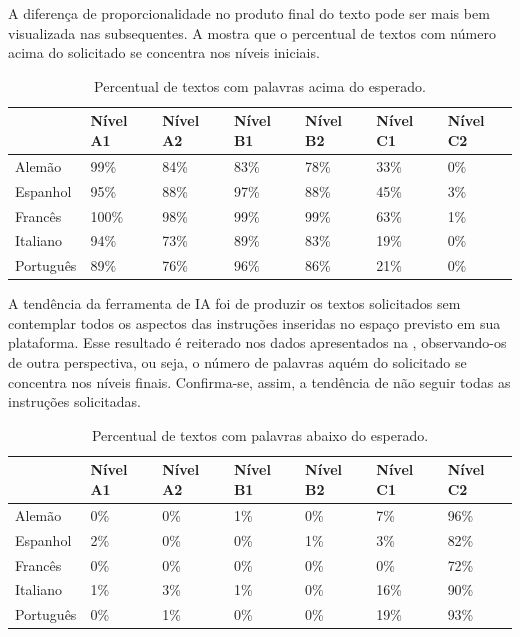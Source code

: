 \documentclass[portuguese]{textolivre}
\begin{document}
A diferença de proporcionalidade no produto final do texto pode ser mais bem visualizada nas  subsequentes. A  mostra que o percentual de textos com número acima do solicitado se concentra nos níveis iniciais. 

\begin{table}[h!]
\centering
\begin{threeparttable}
\caption{Percentual de textos com palavras acima do esperado.}
\label{tab02}
\begin{tabular}{l l l l l l l}
\toprule
& Nível A1 & Nível A2 & Nível B1 & Nível B2 & Nível C1 & Nível C2 \\
 \midrule
Alemão & 99\% & 84\% & 83\% & 78\% & 33\% & 0\% \\
Espanhol  & 95\% & 88\% & 97\% & 88\% & 45\% & 3\% \\
Francês & 100\% & 98\% & 99\% & 99\% & 63\% & 1\% \\
Italiano & 94\% & 73\% & 89\% & 83\% & 19\% & 0\% \\
Português &  89\% & 76\% & 96\% & 86\% & 21\% & 0\% \\
\bottomrule
\end{tabular}
\end{threeparttable}
\end{table}

A tendência da ferramenta de IA foi de produzir os textos solicitados sem contemplar todos os aspectos das instruções inseridas no espaço previsto em sua plataforma. Esse resultado é reiterado nos dados apresentados na , observando-os de outra perspectiva, ou seja, o número de palavras aquém do solicitado se concentra nos níveis finais. Confirma-se, assim, a tendência de não seguir todas as instruções solicitadas.

\begin{table}[h!]
\centering
\begin{threeparttable}
\caption{Percentual de textos com palavras abaixo do esperado.}
\label{tab03}
\begin{tabular}{l l l l l l l}
\toprule
& Nível A1 & Nível A2 & Nível B1 & Nível B2 & Nível C1 & Nível C2 \\
 \midrule
Alemão & 0\% & 0\% & 1\% & 0\% & 7\% & 96\% \\
Espanhol  &  2\% & 0\% & 0\% & 1\% & 3\% & 82\% \\
Francês & 0\% & 0\% & 0\% & 0\% & 0\% & 72\% \\
Italiano & 1\% & 3\% & 1\% & 0\% & 16\% & 90\% \\
Português & 0\% & 1\% & 0\% & 0\% & 19\% & 93\% \\
\bottomrule
\end{tabular}
\end{threeparttable}
\end{table}
\end{document}
